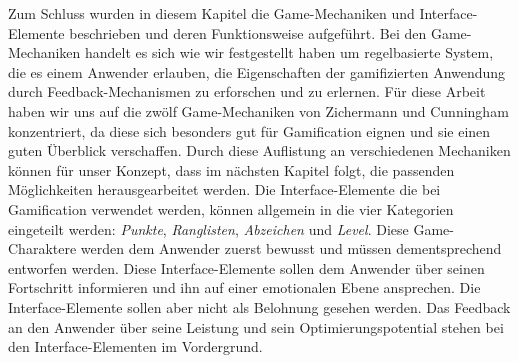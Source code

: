 \documentclass[a4paper,12pt]{scrartcl}
\begin{document}
Zum Schluss wurden in diesem Kapitel die Game-Mechaniken und Interface-Elemente beschrieben und deren Funktionsweise aufgeführt. Bei den Game-Mechaniken handelt es sich wie wir festgestellt haben um regelbasierte System, die es einem Anwender erlauben, die Eigenschaften der gamifizierten Anwendung durch Feedback-Mechanismen zu erforschen und zu erlernen. Für diese Arbeit haben wir uns auf die zwölf Game-Mechaniken von Zichermann und Cunningham \cite{Zichermann2011} konzentriert, da diese sich besonders gut für Gamification eignen und sie einen guten Überblick verschaffen. Durch diese Auflistung an verschiedenen Mechaniken können für unser Konzept, dass im nächsten Kapitel folgt, die passenden Möglichkeiten herausgearbeitet werden. Die Interface-Elemente die bei Gamification verwendet werden, können allgemein in die vier Kategorien eingeteilt werden: \textit{Punkte}, \textit{Ranglisten}, \textit{Abzeichen} und \textit{Level}. Diese Game-Charaktere werden dem Anwender zuerst bewusst und müssen dementsprechend entworfen werden. Diese Interface-Elemente sollen dem Anwender über seinen Fortschritt informieren und ihn auf einer emotionalen Ebene ansprechen. Die Interface-Elemente sollen aber nicht als Belohnung gesehen werden. Das Feedback an den Anwender über seine Leistung und sein Optimierungspotential stehen bei den Interface-Elementen im Vordergrund. 
\newpage
\end{document}
